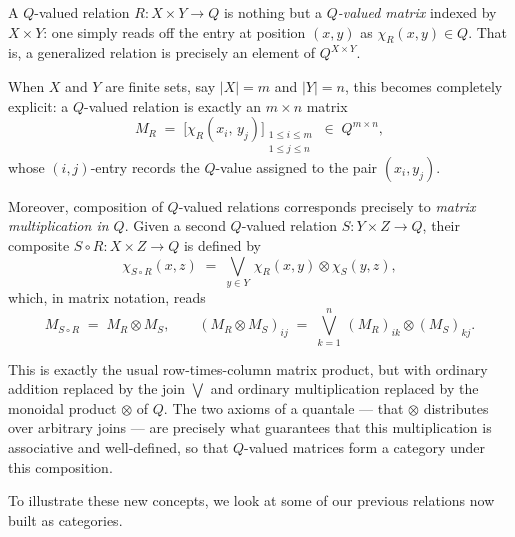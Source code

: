 \begin{remark}
	A $Q$-valued relation $R : X \times Y \to Q$ is nothing but a
	\emph{$Q$-valued matrix} indexed by $X \times Y$: one simply reads
	off the entry at position $(x,y)$ as $\chi_R(x,y) \in Q$.
	That is, a generalized relation is precisely an element of $Q^{X \times Y}$.

	\medskip
	\noindent
	When $X$ and $Y$ are finite sets, say $|X| = m$ and $|Y| = n$,
	this becomes completely explicit: a $Q$-valued relation is exactly
	an $m \times n$ matrix
	\[
		M_R \;=\; \bigl[\chi_R(x_i,\, y_j)\bigr]_{\substack{1 \leq i \leq m \\ 1 \leq j \leq n}}
		\;\in\; Q^{m \times n},
	\]
	whose $(i,j)$-entry records the $Q$-value assigned to the pair
	$(x_i, y_j)$.

	\medskip
	\noindent
	Moreover, composition of $Q$-valued relations corresponds precisely
	to \emph{matrix multiplication in $Q$}.
	Given a second $Q$-valued relation $S : Y \times Z \to Q$, their
	composite $S \circ R : X \times Z \to Q$ is defined by
	\[
		\chi_{S \circ R}(x, z)
		\;=\;
		\bigvee_{y \in Y}\, \chi_R(x,y) \otimes \chi_S(y,z),
	\]
	which, in matrix notation, reads
	\[
		M_{S \circ R} \;=\; M_R \otimes M_S,
		\qquad
		(M_R \otimes M_S)_{ij}
		\;=\;
		\bigvee_{k=1}^{n}\, (M_R)_{ik} \otimes (M_S)_{kj}.
	\]

	This is exactly the usual row-times-column matrix product, but  with ordinary addition replaced by the join $\bigvee$ and ordinary  multiplication replaced by the monoidal product $\otimes$ of $Q$. The two axioms of a quantale — that $\otimes$ distributes over  arbitrary joins — are precisely what guarantees that this  multiplication is associative and well-defined, so that $Q$-valued  matrices form a category under this composition.
\end{remark}

To illustrate these new concepts, we look at some of our previous relations now built as categories.


